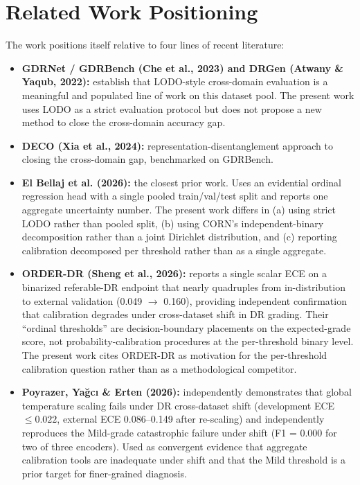 \documentclass[11pt]{article}
\begin{document}
\section{Related Work Positioning}
The work positions itself relative to four lines of recent literature:
\begin{itemize}[leftmargin=*, topsep=0pt]
  \item \textbf{GDRNet / GDRBench (Che et al., 2023) and DRGen (Atwany \& Yaqub, 2022):} establish that LODO-style cross-domain evaluation is a meaningful and populated line of work on this dataset pool. The present work uses LODO as a strict evaluation protocol but does not propose a new method to close the cross-domain accuracy gap.
  \item \textbf{DECO (Xia et al., 2024):} representation-disentanglement approach to closing the cross-domain gap, benchmarked on GDRBench.
  \item \textbf{El Bellaj et al. (2026):} the closest prior work. Uses an evidential ordinal regression head with a single pooled train/val/test split and reports one aggregate uncertainty number. The present work differs in (a) using strict LODO rather than pooled split, (b) using CORN's independent-binary decomposition rather than a joint Dirichlet distribution, and (c) reporting calibration decomposed per threshold rather than as a single aggregate.
  \item \textbf{ORDER-DR (Sheng et al., 2026):} reports a single scalar ECE on a binarized referable-DR endpoint that nearly quadruples from in-distribution to external validation (0.049 $\to$ 0.160), providing independent confirmation that calibration degrades under cross-dataset shift in DR grading. Their ``ordinal thresholds'' are decision-boundary placements on the expected-grade score, not probability-calibration procedures at the per-threshold binary level. The present work cites ORDER-DR as motivation for the per-threshold calibration question rather than as a methodological competitor.
  \item \textbf{Poyrazer, Yağcı \& Erten (2026):} independently demonstrates that global temperature scaling fails under DR cross-dataset shift (development ECE $\leq 0.022$, external ECE 0.086--0.149 after re-scaling) and independently reproduces the Mild-grade catastrophic failure under shift (F1 = 0.000 for two of three encoders). Used as convergent evidence that aggregate calibration tools are inadequate under shift and that the Mild threshold is a prior target for finer-grained diagnosis.
\end{itemize}
\end{document}
